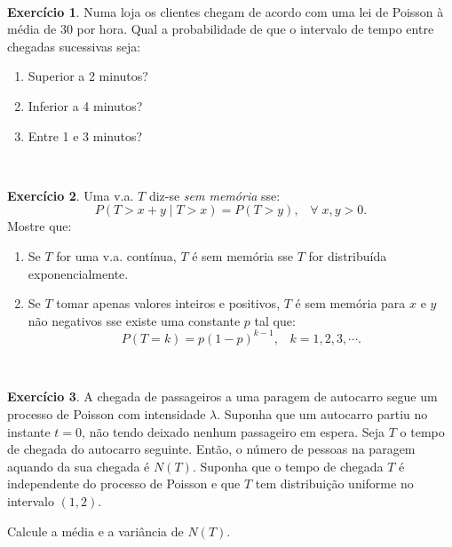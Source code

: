 \documentclass[
  11pt,
  a4paper,
]{book}
\theoremstyle{definition}
\theoremstyle{definition}
\theoremstyle{definition}
\newtheorem{exercise}{Exercício}[chapter]
\theoremstyle{definition}
\theoremstyle{remark}
\begin{document}
\(\,\)

\begin{exercise}
\leavevmode

Numa loja os clientes chegam de acordo com uma lei de Poisson à média de 30 por hora. Qual a probabilidade de que o intervalo de tempo
entre chegadas sucessivas seja:

\begin{enumerate}
\def\labelenumi{(\alph{enumi})}
\item
  Superior a 2 minutos?
\item
  Inferior a 4 minutos?
\item
  Entre 1 e 3 minutos?
\end{enumerate}

\end{exercise}

\(\,\)

\begin{exercise}
\leavevmode

Uma v.a. \(T\) diz-se \emph{sem memória} sse:
\[
P(T>x+y \mid T>x)=P(T>y),\;\;\;\forall \;x,y>0.
\]
Mostre que:

\begin{enumerate}
\def\labelenumi{(\alph{enumi})}
\item
  Se \(T\) for uma v.a. contínua, \(T\) é sem memória sse \(T\) for distribuída exponencialmente.
\item
  Se \(T\) tomar apenas valores inteiros e positivos, \(T\) é sem memória para \(x\) e \(y\) não negativos sse existe uma constante \(p\) tal
  que:
  \[
  P(T=k)=p(1-p)^{k-1},\;\;\;k=1,2,3,\cdots .
  \]
\end{enumerate}

\end{exercise}

\(\,\)

\begin{exercise}
\leavevmode

A chegada de passageiros a uma paragem de autocarro segue um processo de Poisson com intensidade \(\lambda\). Suponha que um autocarro partiu no instante \(t=0\), não tendo deixado nenhum passageiro em espera. Seja \(T\) o tempo de chegada do autocarro seguinte. Então, o número de pessoas na paragem aquando da sua chegada é \(N(T)\). Suponha que o tempo de chegada \(T\) é independente do processo de Poisson e que \(T\) tem distribuição uniforme no intervalo \((1,2)\).

Calcule a média e a variância de \(N(T)\).

\end{exercise}
\end{document}
